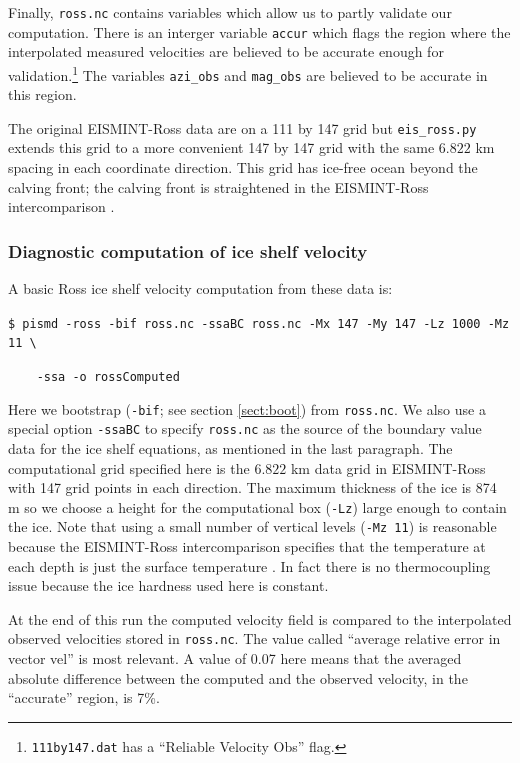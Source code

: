 \documentclass[11pt,final]{amsart}
\begin{document}
Finally, \verb|ross.nc| contains variables which allow us to partly validate our computation.  There is an interger variable \verb|accur| which flags the region where the interpolated measured velocities are believed to be accurate enough for validation.\footnote{\texttt{111by147.dat} has a ``Reliable Velocity Obs'' flag.}  The variables \verb|azi_obs| and \verb|mag_obs| are believed to be accurate in this region.

The original EISMINT-Ross data are on a 111 by 147 grid but \verb|eis_ross.py| extends this grid to a more convenient 147 by 147 grid with the same $6.822$ km spacing in each coordinate direction.  This grid has ice-free ocean beyond the calving front; the calving front is straightened in the EISMINT-Ross intercomparison \cite{MacAyealetal}.

\subsubsection*{Diagnostic computation of ice shelf velocity}  A basic Ross ice shelf velocity computation from these data is:

\verb|$ pismd -ross -bif ross.nc -ssaBC ross.nc -Mx 147 -My 147 -Lz 1000 -Mz 11 \|

\verb|    -ssa -o rossComputed|

\noindent Here we bootstrap (\verb|-bif|; see section \ref{sect:boot}) from \verb|ross.nc|.  We also use a special option \verb|-ssaBC| to specify \verb|ross.nc| as the source of the boundary value data for the ice shelf equations, as mentioned in the last paragraph.  The computational grid specified here is the $6.822$ km data grid in EISMINT-Ross with 147 grid points in each direction.  The maximum thickness of the ice is 874 m so we choose a height for the computational box (\verb|-Lz|) large enough to contain the ice.  Note that using a small number of vertical levels (\verb|-Mz 11|) is reasonable because the EISMINT-Ross intercomparison specifies that the temperature at each depth is just the surface temperature \cite{MacAyealetal}.  In fact there is no thermocoupling issue because the ice hardness used here is constant.

At the end of this run the computed velocity field is compared to the interpolated observed velocities stored in \verb|ross.nc|.  The value called ``average relative error in vector vel'' is most relevant.  A value of 0.07 here means that the averaged absolute difference between the computed and the observed velocity, in the ``accurate'' region, is 7\%.
\end{document}
